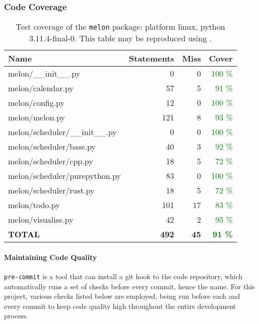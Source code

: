 \subsubsection{Code Coverage}
\begin{table}[H]
  \centering
  \caption{Test coverage of the \texttt{melon} package: platform linux, python 3.11.4-final-0. This table may be reproduced using .}
  \begin{tabular}{lrrr}
    \hline
    \bf Name                        & \bf Statements & \bf Miss & \bf Cover                    \\
    \hline
    melon/\_\_init\_\_.py           & 0              & 0        & \textcolor{green}{100 \%}    \\
    melon/calendar.py               & 57             & 5        & \textcolor{green}{91 \%}     \\
    melon/config.py                 & 12             & 0        & \textcolor{green}{100 \%}    \\
    melon/melon.py                  & 121            & 8        & \textcolor{green}{93 \%}     \\
    melon/scheduler/\_\_init\_\_.py & 0              & 0        & \textcolor{green}{100 \%}    \\
    melon/scheduler/base.py         & 40             & 3        & \textcolor{green}{92 \%}     \\
    melon/scheduler/cpp.py          & 18             & 5        & \textcolor{green}{72 \%}     \\
    melon/scheduler/purepython.py   & 83             & 0        & \textcolor{green}{100 \%}    \\
    melon/scheduler/rust.py         & 18             & 5        & \textcolor{green}{72 \%}     \\
    melon/todo.py                   & 101            & 17       & \textcolor{green}{83 \%}     \\
    melon/visualise.py              & 42             & 2        & \textcolor{green}{95 \%}     \\
    \hline
    \bf TOTAL                       & \bf 492        & \bf 45   & \bf \textcolor{green}{91 \%}
  \end{tabular}
\end{table}

\paragraph{Maintaining Code Quality}
\texttt{pre-commit} is a tool that can install a git hook to the code repository, which automatically runs a set of checks before every commit, hence the name.
For this project, various checks listed below are employed, being run before each and every commit to keep code quality high throughout the entire development process.

